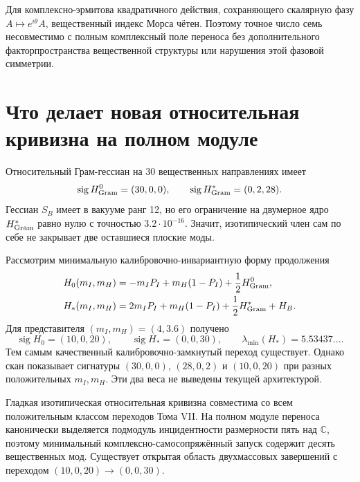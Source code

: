 Для комплексно-эрмитова квадратичного действия, сохраняющего скалярную фазу
$A\mapsto e^{i\theta}A$, вещественный индекс Морса чётен. Поэтому точное
число семь несовместимо с полным комплексный поле переноса без дополнительного
факторпространства вещественной структуры или нарушения этой фазовой симметрии.

\section{Что делает новая относительная кривизна на полном модуле}

Относительный Грам-гессиан на 30 вещественных направлениях имеет
\begin{equation}
 \operatorname{sig}H_{\rm Gram}^{0}=(30,0,0),
 \qquad
 \operatorname{sig}H_{\rm Gram}^{*}=(0,2,28).
 \label{eq:v8-full-transfer-gram-signatures-again}
\end{equation}
Гессиан $S_B$ имеет в вакууме ранг 12, но его ограничение на двумерное ядро
$H_{\rm Gram}^{*}$ равно нулю с точностью $3.2\cdot10^{-16}$. Значит,
изотипический член сам по себе не закрывает две оставшиеся плоские моды.

Рассмотрим минимальную калибровочно-инвариантную форму продолжения
\begin{align}
 H_0(m_I,m_H)
 &=-m_IP_I+m_H(1-P_I)+\frac12H_{\rm Gram}^{0},\label{eq:v8-full-origin-two-mass-completion}\\
 H_*(m_I,m_H)
 &=2m_IP_I+m_H(1-P_I)+\frac12H_{\rm Gram}^{*}+H_B.
 \label{eq:v8-full-vacuum-two-mass-completion}
\end{align}
Для представителя $(m_I,m_H)=(4,3.6)$ получено
\begin{equation}
 \operatorname{sig}H_0=(10,0,20),
 \qquad
 \operatorname{sig}H_*=(0,0,30),
 \qquad
 \lambda_{\min}(H_*)=5.53437\ldots.
 \label{eq:v8-full-transfer-qualitative-transition}
\end{equation}
Тем самым качественный калибровочно-замкнутый переход существует. Однако скан
показывает сигнатуры $(30,0,0)$, $(28,0,2)$ и $(10,0,20)$ при разных
положительных $m_I,m_H$. Эти два веса не выведены текущей архитектурой.

\begin{theorem}
Гладкая изотипическая относительная кривизна совместима со всем положительным
классом переходов Тома VII. На полном модуле переноса канонически выделяется
подмодуль инцидентности размерности пять над $\mathbb C$, поэтому минимальный
комплексно-самосопряжённый запуск содержит десять вещественных мод. Существует
открытая область двухмассовых завершений с переходом
$(10,0,20)\to(0,0,30)$.
\end{theorem}

